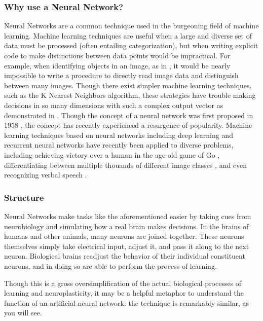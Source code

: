\documentclass{article}
\begin{document}
\subsubsection{Why use a Neural Network?}
Neural Networks are a common technique used in the burgeoning field of machine learning. Machine learning techniques are useful when a large and diverse set of data must be processed (often entailing categorization), but when writing explicit code to make distinctions between data points would be impractical. For example, when identifying objects in an image, as in \cite{hinton12}, it would be nearly impossible to write a procedure to directly read image data and distinguish between many images. Though there exist simpler machine learning techniques, such as the K Nearest Neighbors algorithm, these strategies have trouble making decisions in so many dimensions with such a complex output vector as demonstrated in \cite{knnic}. Though the concept of a neural network was first proposed in 1958 \cite{rosenblatt58}, the concept has recently experienced a resurgence of popularity. Machine learning techniques based on neural networks including deep learning \cite{mitdeeplearning} and recurrent neural networks \cite{recurrentsurvey} have recently been applied to diverse problems, including achieving victory over a human in the age-old game of Go \cite{go1}\cite{go2}, differentiating between multiple thouands of different image classes \cite{hinton12}, and even recognizing verbal speech \cite{rnnspoken}.

\subsubsection{Structure}
Neural Networks make tasks like the aforementioned easier by taking cues from neurobiology and simulating how a real brain makes decisions. In the brains of humans and other animals, many neurons are joined together. These neurons themselves simply take electrical input, adjust it, and pass it along to the next neuron. Biological brains readjust the behavior of their individual constituent neurons, and in doing so are able to perform the process of learning.

Though this is a gross oversimplification of the actual biological processes of learning and neuroplasticity, it may be a helpful metaphor to understand the function of an artificial neural network: the technique is remarkably similar, as you will see.
\end{document}

